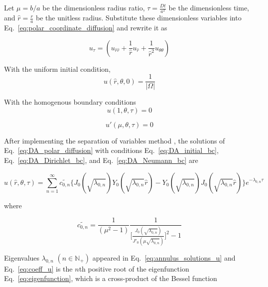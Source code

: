 Let $\mu = b/a$ be the dimensionless radius ratio, $\tau =
\frac{Dt}{a^2}$ be the dimensionless time, and $\hat r = \frac{r}{a}$
be the unitless radius. Substitute these dimensionless variables into
Eq.~\ref{eq:polar_coordinate_diffusion} and rewrite it as

\begin{equation}\label{eq:DA_polar_diffusion}
  u_\tau = (u_{\hat r \hat r} + \frac{1}{\hat r} u_{\hat r} + \frac{1}{\hat r ^2} u_{\theta\theta})
\end{equation}

With the uniform initial condition,
\begin{equation}\label{eq:DA_initial_bc}
  u(\hat r, \theta, 0) = \frac{1}{|\Omega|}
\end{equation}

With the homogenous boundary conditions
\begin{equation}\label{eq:DA_Dirichlet_bc}
  u(1, \theta, \tau) = 0
\end{equation}

\begin{equation}\label{eq:DA_Neumann_bc}
  u'(\mu, \theta, \tau) = 0
\end{equation}



After implementing the separation of variables method
\cite{crank1979mathematics}, the solutions of
Eq.~\ref{eq:DA_polar_diffusion} with conditions
Eq.~\ref{eq:DA_initial_bc}, Eq.~\ref{eq:DA_Dirichlet_bc}, and
Eq.~\ref{eq:DA_Neumann_bc} are

\begin{equation}\label{eq:annulus_solutions_u}
  u(\hat r, \theta, \tau) = \sum_{n=1}^{\infty}
  \tilde{c_{0,n}} \bigg\{J_0(\sqrt{\lambda_{0,n}})
  Y_0(\sqrt{\lambda_{0,n}} \hat r) -
  Y_0(\sqrt{\lambda_{0,n}}) J_0(\sqrt{\lambda_{0,n}} \hat
  r)\bigg\} e^{-\lambda_{0,n}\tau}
\end{equation}

where

\begin{equation}\label{eq:coeff_u}
  \tilde{c_{0,n}} = \frac{1}{(\mu^2 - 1)}
\frac{1}{\bigg[\frac{J_0(\sqrt{\lambda_{0,n}})}{J'_0(\mu
      \sqrt{\lambda_{0,n}})}\bigg]^2 -1}
\end{equation}


Eigenvalues $\lambda_{0, n}$ $(n \in \mathbb{N}_{+})$ appeared in
Eq.~\ref{eq:annulus_solutions_u} and Eq.~\ref{eq:coeff_u} is the $n$th
positive root of the eigenfunction Eq.~\ref{eq:eigenfunction}, which
is a cross-product of the Bessel function \cite{watson1995treatise}

